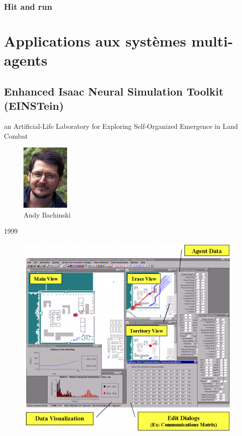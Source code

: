 \documentclass{article}
\begin{document}
\subsubsection{Hit and run}




\section{Applications aux systèmes multi-agents}

\subsection{Enhanced Isaac Neural Simulation Toolkit (EINSTein)}
an Artificial-Life Laboratory for Exploring Self-Organized Emergence in Land Combat
\begin{figure}[H]
	\begin{centering}
	\includegraphics[]{../ressources/ilachinski}
	\caption{Andy Ilachinski}
	\end{centering}
\end{figure}
1999
\begin{figure}[H]
	\begin{centering}
	\includegraphics[width=\linewidth]{../ressources/Einstein}
	\caption{}
	\end{centering}
\end{figure}
\cite{simu_guerre,ilachinski1994,ilachinski1999}
\end{document}
